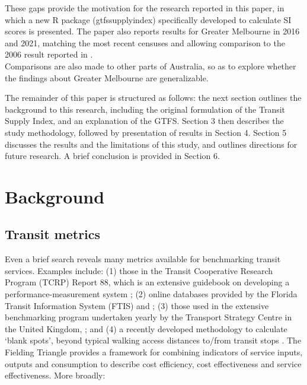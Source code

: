\documentclass[preprint, 3p,
authoryear]{elsarticle} %
\begin{document}
These gaps provide the motivation for the research reported in this
paper, in which a new R package (gtfssupplyindex) specifically developed
to calculate SI scores is presented. The paper also reports results for
Greater Melbourne in 2016 and 2021, matching the most recent censuses
and allowing comparison to the 2006 result reported in
\citet{currie2010identifying}.\\
Comparisons are also made to other parts of Australia, so as to explore
whether the findings about Greater Melbourne are generalizable.

The remainder of this paper is structured as follows: the next section
outlines the background to this research, including the original
formulation of the Transit Supply Index, and an explanation of the GTFS.
Section 3 then describes the study methodology, followed by presentation
of results in Section 4. Section 5 discusses the results and the
limitations of this study, and outlines directions for future research.
A brief conclusion is provided in Section 6.

\hypertarget{background}{%
\section{Background}\label{background}}

\hypertarget{transit-metrics}{%
\subsection{Transit metrics}\label{transit-metrics}}

Even a brief search reveals many metrics available for benchmarking
transit services. Examples include: (1) those in the Transit Cooperative
Research Program (TCRP) Report 88, which is an extensive guidebook on
developing a performance-measurement system \citep{Ryus:2003aa}; (2)
online databases provided by the Florida Transit Information System
(FTIS) \citep{Florida-Transit-Information-System:2018aa} and
\citet{UITP:2015aa}; (3) those used in the extensive benchmarking
program undertaken yearly by the Transport Strategy Centre in the United
Kingdom, \citep{Imperial-College-London:2023aa}; and (4) a recently
developed methodology to calculate `blank spots', beyond typical walking
access distances to/from transit stops \citep{AlamriSultan2023GAoA}. The
Fielding Triangle \citep{FieldingGordonJ1987Mpts} provides a framework
for combining indicators of service inputs, outputs and consumption to
describe cost efficiency, cost effectiveness and service effectiveness.
More broadly:
\end{document}
